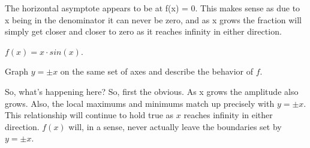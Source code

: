 \documentclass[10pt,letterpaper]{amspset}
\begin{document}
\begin{solution}
    
    The horizontal asymptote appears to be at f(x) = 0. This makes sense as due to x being in the denominator it can never be zero, and as x grows the fraction will simply get closer and closer to zero as it reaches infinity in either direction.
\end{solution}


\begin{problem}[46]
    $f(x) = x \cdot sin(x)$. 
    
    Graph $y = \pm x$ on the same set of axes and describe the behavior of $f$. 
\end{problem}

\begin{solution}
    
    So, what's happening here? So, first the obvious. As x grows the amplitude also grows. Also, the local maximums and minimums match up precisely with $y = \pm x$. This relationship will continue to hold true as $x$ reaches infinity in either direction. $f(x)$ will, in a sense, never actually leave the boundaries set by $y = \pm x$.
\end{solution}
\end{document}
